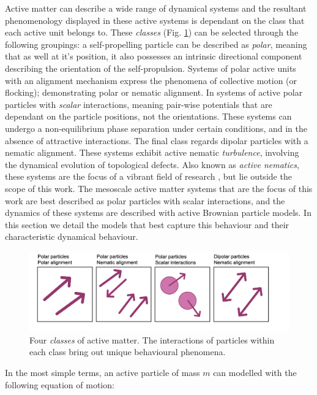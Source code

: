Active matter can describe a wide range of dynamical systems and the resultant phenomenology displayed in these active systems is dependant on the class that each active unit belongs to. These \textit{classes} (Fig.  \ref{fig:AMclasses}) can be selected through the following groupings: a self-propelling particle can be described as \textit{polar}, meaning that as well at it's position, it also possesses an intrinsic directional component describing the orientation of the self-propulsion. Systems of polar active units with an alignment mechanism express the phenomena of collective motion (or flocking); demonstrating polar or nematic alignment.
In systems of active polar particles with \textit{scalar} interactions, meaning pair-wise potentials that are dependant on the particle positions, not the orientations. These systems can undergo a non-equilibrium phase separation under certain conditions, and in the absence of attractive interactions. 
The final class regards dipolar particles with a nematic alignment. These systems exhibit active nematic \textit{turbulence}, involving the dynamical evolution of  topological defects. Also known as \textit{active nematics}, these systems are the focus of a vibrant field of research \cite{doostmohammadi2018,giomi2015,alert2020}, but lie outside the scope of this work. The mesoscale active matter systems that are the focus of this work are best described as polar particles with scalar interactions, and the dynamics of these systems are described with active Brownian particle models. In this section we detail the models that best capture this behaviour and their characteristic dynamical behaviour.


\begin{figure}
	\includegraphics[width=0.9\linewidth]{chapters/activeMatter/figsActiveMatter/figParticleType}
	\centering
	\caption[Classes of active matter]{Four \textit{classes} of active matter. The interactions of particles within each class bring out unique behavioural phenomena.}
	\label{fig:AMclasses}	
\end{figure}


In the most simple terms, an active particle of mass $m$ can modelled with the following equation of motion:


